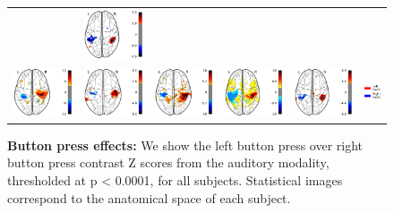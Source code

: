 \begin{figure}[hb]
\begin{tabular}{cccccl}
&{\includegraphics[width=.14\linewidth]{figures/part_II/press_vis_06.pdf}}
\hspace{1ex}
& {} \\
{\includegraphics[width=.14\linewidth]{figures/part_II/press_aud_01.pdf}}
\hspace{1ex}
&{\includegraphics[width=.14\linewidth]{figures/part_II/press_aud_03.pdf}}
\hspace{1ex}
&{\includegraphics[width=.14\linewidth]{figures/part_II/press_aud_04.pdf}}
\hspace{1ex}
&{\includegraphics[width=.14\linewidth]{figures/part_II/press_aud_05.pdf}}
\hspace{1ex}
&{\includegraphics[width=.14\linewidth]{figures/part_II/press_aud_06.pdf}}
\hspace{1ex}
&{\includegraphics[width=.10\linewidth]{figures/part_II/press_legend.pdf}} \\
\end{tabular}
\vspace{3ex}
\caption{\textbf{Button press effects:} We show the left button press over right button press contrast Z scores from the auditory modality, thresholded at p < 0.0001, for all subjects. Statistical images correspond to the anatomical space of each subject.}
\label{fig:button_press}
\end{figure}


